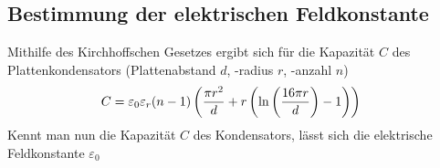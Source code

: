 \subsection{Bestimmung der elektrischen Feldkonstante}
Mithilfe des Kirchhoffschen Gesetzes ergibt sich für die Kapazität $C$ des Plattenkondensators (Plattenabstand $d$, -radius $r$, -anzahl $n$)
\begin{align}
C&=\varepsilon_0\varepsilon_r\*(n-1)\*\left(\frac{\pi r^2}{d}+r\*\left(\ln{\left(\frac{16\pi r}{d}\right)}-1\right)\right)
\end{align}
Kennt man nun die Kapazität $C$ des Kondensators, lässt sich die elektrische Feldkonstante $\varepsilon_0$